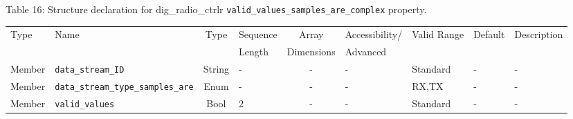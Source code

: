 \documentclass{article}
\def\comp{dig\_radio\_ctrlr}
\begin{document}
\begin{landscape}
	\noindent Table \hypertarget{tab16}{16}: Structure declaration for \comp{} \verb+valid_values_samples_are_complex+ property.
	\begin{scriptsize}
		\noindent\begin{longtable}{|p{1.8cm}|p{3.6cm}|c|p{2cm}|c|p{2cm}|p{1.7cm}|p{0.8cm}|p{6.81cm}|}
			\hline
			\rowcolor{blue}
			Type         & Name                                & Type & Sequence & Array      & Accessibility/ & Valid Range  & Default & Description                                                                                                                                                                                                                       \\
			\rowcolor{blue}
			             &                                     &      & Length   & Dimensions & Advanced       &              &         &                                                                                                                                                                                                                             \\
			\hline
			Member       & \verb+data_stream_ID+               & String& -       & -          & -              & Standard     & -       & - \\
			\hline
			Member       & \verb+data_stream_type_samples_are+ & Enum  & -       & -          & -              & RX,TX        & -       & - \\
			\hline
			Member       & \verb+valid_values+                 & Bool  & 2       & -          & -              & Standard & -       & - \\
			\hline
		\end{longtable}
	\end{scriptsize}


\end{landscape}
\end{document}
